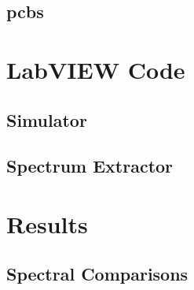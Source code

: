 

\section{\acrshort{pcbs}}



\chapter{LabVIEW Code}
\label{App:VI}

\clearpage

\section{Simulator}
\label{App:Sim}




\section{Spectrum Extractor}
\label{App:Analyse}




\chapter{Results}

\clearpage


\section{Spectral Comparisons}
\label{App:Comp}

